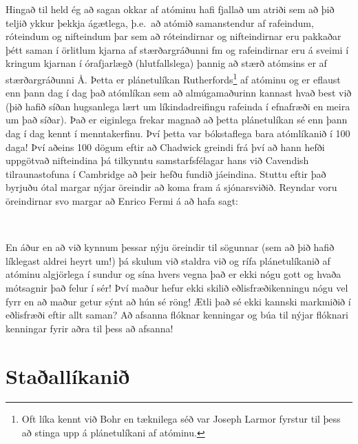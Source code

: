 \ifdefined \wholebook \else\documentclass[oneside]{book}\usepackage{EdlBook}\graphicspath{{figures/}}
\begin{document}
Hingað til held ég að sagan okkar af atóminu hafi fjallað um atriði sem að þið teljið ykkur þekkja ágætlega, þ.e.~að atómið samanstendur af rafeindum, róteindum og nifteindum þar sem að róteindirnar og nifteindirnar eru pakkaðar þétt saman í örlitlum kjarna af stærðargráðunni \si{fm} og rafeindirnar eru á sveimi í kringum kjarnan í órafjarlægð (hlutfallslega) þannig að stærð atómsins er af stærðargráðunni \si{\AA}. Þetta er plánetulíkan Rutherfords\footnote{Oft líka kennt við Bohr en tæknilega séð var Joseph Larmor fyrstur til þess að stinga upp á plánetulíkani af atóminu.} af atóminu og er eflaust enn þann dag í dag það atómlíkan sem að almúgamaðurinn kannast hvað best við (þið hafið síðan hugsanlega lært um líkindadreifingu rafeinda í efnafræði en meira um það síðar). Það er eiginlega frekar magnað að þetta plánetulíkan sé enn þann dag í dag kennt í menntakerfinu. Því þetta var bókstaflega bara atómlíkanið í 100 daga! Því aðeins 100 dögum eftir að Chadwick greindi frá því að hann hefði uppgötvað nifteindina þá tilkynntu samstarfsfélagar hans við Cavendish tilraunastofuna í Cambridge að þeir hefðu fundið jáeindina. Stuttu eftir það byrjuðu ótal margar nýjar öreindir að koma fram á sjónarsviðið. Reyndar voru öreindirnar svo margar að Enrico Fermi á að hafa sagt:

\begin{tcolorbox}

 \\

\vspace{-0.3cm}
\end{tcolorbox}

En áður en að við kynnum þessar nýju öreindir til sögunnar (sem að þið hafið líklegast aldrei heyrt um!) þá skulum við staldra við og rífa plánetulíkanið af atóminu algjörlega í sundur og sína hvers vegna það er ekki nógu gott og hvaða mótsagnir það felur í sér! Því maður hefur ekki skilið eðlisfræðikenningu nógu vel fyrr en að maður getur sýnt að hún sé röng! Ætli það sé ekki kannski markmiðið í eðlisfræði eftir allt saman? Að afsanna flóknar kenningar og búa til nýjar flóknari kenningar fyrir aðra til þess að afsanna! \\


\section{Staðallíkanið}
\end{document}
